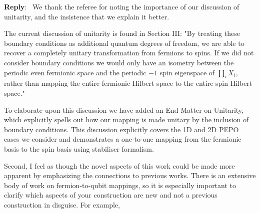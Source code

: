 \documentclass[aps,prx,floatfix,10pt,amssymb,amsfont,amsmath,superscriptaddress,float,nofootinbib,longbibliography,nobalancelastpage]{revtex4-2}
\newenvironment{reply}
   {\medskip \noindent \begin{sf}\textbf{Reply}:\ \color{blue}  }
   {\medskip \end{sf}}
\begin{document}
\begin{reply}
    We thank the referee for noting the importance of our discussion of unitarity, and the insistence that we explain it better. %

    The current discussion of unitarity is found in Section III:
    "By treating these boundary conditions as additional quantum degrees of freedom, we are able to recover a completely unitary transformation from fermions to spins. If we did not consider boundary conditions we would only have an isometry between the periodic even fermionic space and the periodic $-1$ spin eigenspace of $\prod_i X_i$, rather than mapping the entire fermionic Hilbert space to the entire spin Hilbert space."

    To elaborate upon this discussion we have added an End Matter on Unitarity, which explicitly spells out how our mapping is made unitary by the inclusion of boundary conditions. This discussion explicitly covers the 1D and 2D PEPO cases we consider and demonstrates a one-to-one mapping from the fermionic basis to the spin basis using stabiliser formalism.
\end{reply}

Second, I feel as though the novel aspects of this work could be made more apparent by emphasizing the connections to previous works. There is an extensive body of work on fermion-to-qubit
mappings, so it is especially important to clarify which aspects of your construction are new and not a previous construction in disguise. For example,
\end{document}

